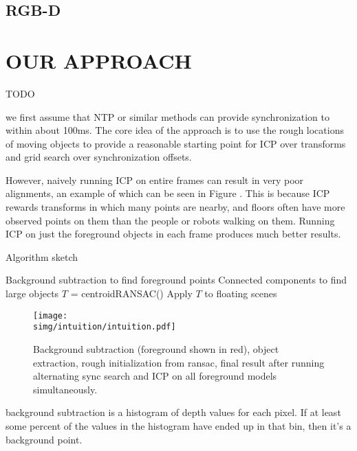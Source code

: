 \documentclass[letterpaper, 10 pt, conference]{ieeeconf}  %
\newcommand{\simg}{static_img}
\begin{document}
\subsection{RGB-D}


\section{OUR APPROACH}
TODO




 we first assume that NTP or similar methods can provide synchronization to within about 100ms.  The core idea of the approach is to use the rough locations of moving objects to provide a reasonable starting point for ICP over transforms and grid search over synchronization offsets.

However, naively running ICP on entire frames can result in very poor alignments, an example of which can be seen in Figure .  This is because ICP rewards transforms in which many points are nearby, and floors often have more observed points on them than the people or robots walking on them.  Running ICP on just the foreground objects in each frame produces much better results.


\begin{algorithm}
  \caption{Algorithm sketch}
  \label{alg:sketch}
  \SetLine
  \phantom{\;}
  Background subtraction to find foreground points\;
  Connected components to find large objects\;
  $T$ = centroidRANSAC()\;
  Apply $T$ to floating scenes\;
\end{algorithm}

\begin{figure*}
  \centering
  \texttt{[image: \\simg/intuition/intuition.pdf]}
  \caption{Background subtraction (foreground shown in red), object extraction, rough initialization from ransac, final result after running alternating sync search and ICP on all foreground models simultaneously. }
  \label{fig:}
\end{figure*}


background subtraction is a histogram of depth values for each pixel.  If at least some percent of the values in the histogram have ended up in that bin, then it's a background point.
\end{document}
